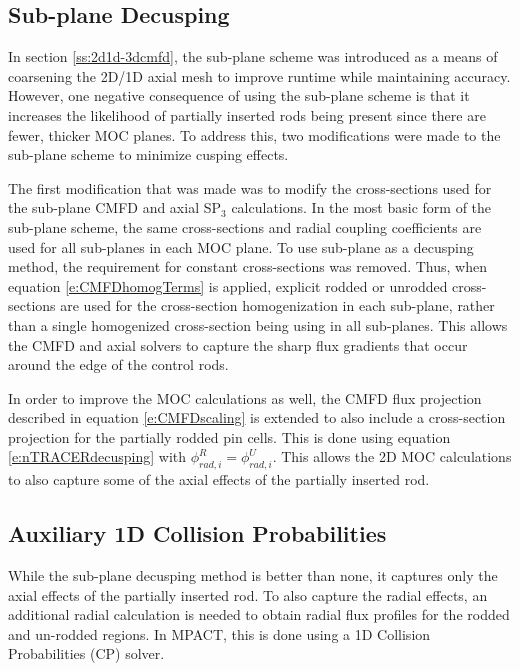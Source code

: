 \subsection{Sub-plane Decusping}

In section \ref{ss:2d1d-3dcmfd}, the sub-plane scheme was introduced as a means of coarsening the 2D/1D axial mesh to improve runtime while maintaining accuracy.  However, one negative consequence of using the sub-plane scheme is that it increases the likelihood of partially inserted rods being present since there are fewer, thicker MOC planes.  To address this, two modifications were made to the sub-plane scheme to minimize cusping effects.

The first modification that was made was to modify the cross-sections used for the sub-plane CMFD and axial SP$_3$ calculations.  In the most basic form of the sub-plane scheme, the same cross-sections and radial coupling coefficients are used for all sub-planes in each MOC plane.  To use sub-plane as a decusping method, the requirement for constant cross-sections was removed.  Thus, when equation \ref{e:CMFDhomogTerms} is applied, explicit rodded or unrodded cross-sections are used for the cross-section homogenization in each sub-plane, rather than a single homogenized cross-section being using in all sub-planes.  This allows the CMFD and axial solvers to capture the sharp flux gradients that occur around the edge of the control rods.

In order to improve the MOC calculations as well, the CMFD flux projection described in equation \ref{e:CMFDscaling} is extended to also include a cross-section projection for the partially rodded pin cells.  This is done using equation \ref{e:nTRACERdecusping} with $\phi_{rad,i}^R = \phi_{rad,i}^U$.  This allows the 2D MOC calculations to also capture some of the axial effects of the partially inserted rod.

\subsection{Auxiliary 1D Collision Probabilities}

While the sub-plane decusping method is better than none, it captures only the axial effects of the partially inserted rod.  To also capture the radial effects, an additional radial calculation is needed to obtain radial flux profiles for the rodded and un-rodded regions.  In MPACT, this is done using a 1D Collision Probabilities (CP) solver.

